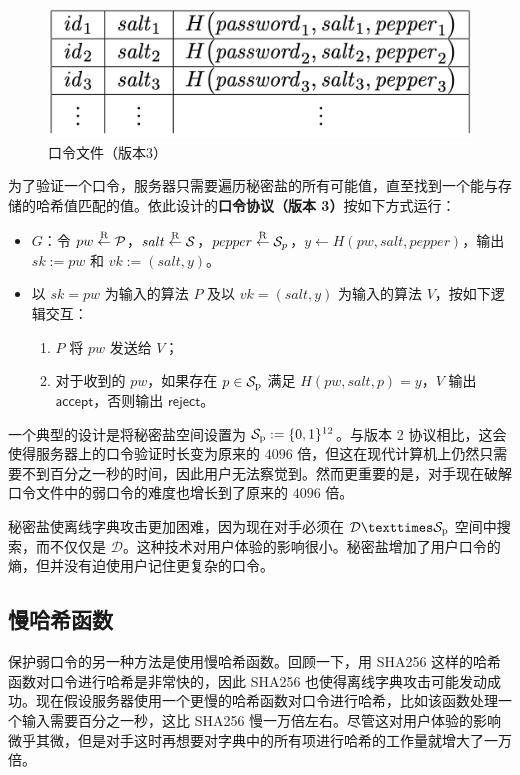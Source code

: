\begin{figure}
  \centering
  \includegraphics[width=0.45\linewidth]{figures/chapter18/fig5.png}
  \caption{口令文件（版本3）}
  \label{fig:18-5}
\end{figure}

为了验证一个口令，服务器只需要遍历秘密盐的所有可能值，直至找到一个能与存储的哈希值匹配的值。依此设计的\textbf{口令协议（版本 3）}按如下方式运行：
\begin{itemize}
	\item $G$：令 $pw\overset{\rm R}\leftarrow\mathcal{P}$，$salt\overset{\rm R}\leftarrow\mathcal{S}$，$pepper\overset{\rm R}\leftarrow\mathcal{S}_p$，$y\leftarrow H(pw,salt,pepper)$，输出 $sk:=pw$ 和 $vk:=(salt,y)$。
	\item 以 $sk=pw$ 为输入的算法 $P$ 及以 $vk=(salt,y)$ 为输入的算法 $V$，按如下逻辑交互：
	\begin{enumerate}
		\item $P$ 将 $pw$ 发送给 $V$；
		\item 对于收到的 $pw$，如果存在 $p\in\mathcal{S}_{\rm p}$ 满足 $H(pw,salt,p)=y$，$V$ 输出 $\mathsf{accept}$，否则输出 $\mathsf{reject}$。
	\end{enumerate}
\end{itemize}

一个典型的设计是将秘密盐空间设置为 $\mathcal{S}_{\rm p}:=\{0,1\}^{12}$。与版本 2 协议相比，这会使得服务器上的口令验证时长变为原来的 $4096$ 倍，但这在现代计算机上仍然只需要不到百分之一秒的时间，因此用户无法察觉到。然而更重要的是，对手现在破解口令文件中的弱口令的难度也增长到了原来的 $4096$ 倍。

秘密盐使离线字典攻击更加困难，因为现在对手必须在 $\mathcal{D}×\mathcal{S}_{\rm p}$ 空间中搜索，而不仅仅是 $\mathcal{D}$。这种技术对用户体验的影响很小。秘密盐增加了用户口令的熵，但并没有迫使用户记住更复杂的口令。

\subsection{慢哈希函数}

保护弱口令的另一种方法是使用慢哈希函数。回顾一下，用 SHA256 这样的哈希函数对口令进行哈希是非常快的，因此 SHA256 也使得离线字典攻击可能发动成功。现在假设服务器使用一个更慢的哈希函数对口令进行哈希，比如该函数处理一个输入需要百分之一秒，这比 SHA256 慢一万倍左右。尽管这对用户体验的影响微乎其微，但是对手这时再想要对字典中的所有项进行哈希的工作量就增大了一万倍。

